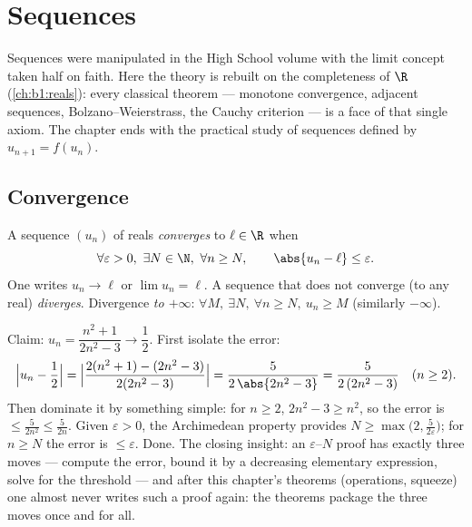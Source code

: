 \chapter{Sequences}\label{ch:b1:seq}

Sequences were manipulated in the High School volume with the limit
concept taken half on faith. Here the theory is rebuilt on the
completeness of $\R$ (\cref{ch:b1:reals}): every classical theorem
--- monotone convergence, adjacent sequences, Bolzano--Weierstrass,
the Cauchy criterion --- is a face of that single axiom. The chapter
ends with the practical study of sequences defined by $u_{n+1} =
f(u_n)$.

\section{Convergence}

\begin{definition}\label{def:b1:seq:limit}
A sequence $(u_n)$ of reals \emph{converges} to $\ell \in \R$
when
\[
\forall \varepsilon > 0,\ \exists N \in \N,\ \forall n \geq N,
\qquad \abs{u_n - \ell} \leq \varepsilon .
\]
One writes $u_n \to \ell$ or $\lim u_n = \ell$. A sequence that does
not converge (to any real) \emph{diverges}. Divergence \emph{to
$+\infty$}: $\forall M,\ \exists N,\ \forall n \geq N,\ u_n \geq M$
(similarly $-\infty$).
\end{definition}

\begin{example}\label{ex:b1:seq:epsilonN}
Claim: $u_n = \dfrac{n^2 + 1}{2n^2 - 3} \to \dfrac12$. First
isolate the error:
\[
\Bigl| u_n - \frac12 \Bigr|
= \Bigl| \frac{2(n^2 + 1) - (2n^2 - 3)}{2(2n^2 - 3)} \Bigr|
= \frac{5}{2\,\abs{2n^2 - 3}}
= \frac{5}{2\,(2n^2 - 3)} \quad (n \geq 2).
\]
Then dominate it by something simple: for $n \geq 2$, $2n^2 - 3
\geq n^2$, so the error is $\leq \frac{5}{2n^2} \leq \frac 5{2n}$.
Given $\varepsilon > 0$, the Archimedean property provides $N \geq
\max\bigl(2, \frac{5}{2\varepsilon}\bigr)$; for $n \geq N$ the
error is $\leq \varepsilon$. Done. The closing insight: an
$\varepsilon$--$N$ proof has exactly three moves --- compute the
error, bound it by a decreasing elementary expression, solve for
the threshold --- and after this chapter's theorems (operations,
squeeze) one almost never writes such a proof again: the theorems
package the three moves once and for all.
\end{example}

